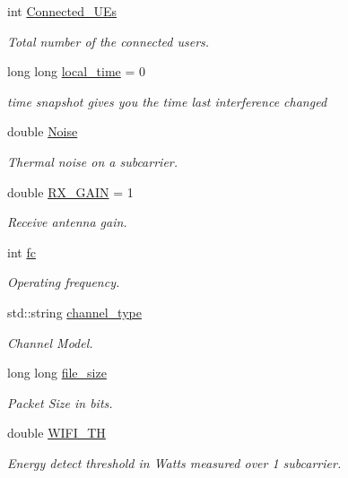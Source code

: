\begin{DoxyCompactItemize}
int \hyperlink{classAP_af0d927a781e8776c18758508a6845c85}{Connected\-\_\-\-U\-Es}
\begin{DoxyCompactList}\small\item\em Total number of the connected users. \end{DoxyCompactList}\item 
long long \hyperlink{classAP_ab31a52cd05ca5daf9ccd5d24941fe395}{local\-\_\-time} = 0
\begin{DoxyCompactList}\small\item\em time snapshot gives you the time last interference changed \end{DoxyCompactList}\item 
double \hyperlink{classAP_ae865c89ed6f1bace113d6ddb1a4f41d3}{Noise}
\begin{DoxyCompactList}\small\item\em Thermal noise on a subcarrier. \end{DoxyCompactList}\item 
double \hyperlink{classAP_ab6036cf0065beea6c6129d086ceb5ad5}{R\-X\-\_\-\-G\-A\-I\-N} = 1
\begin{DoxyCompactList}\small\item\em Receive antenna gain. \end{DoxyCompactList}\item 
int \hyperlink{classAP_af7f928faaa72cbfe5c4f905cb146a564}{fc}
\begin{DoxyCompactList}\small\item\em Operating frequency. \end{DoxyCompactList}\item 
std\-::string \hyperlink{classAP_a334f5b7be9725824797db57032de80e2}{channel\-\_\-type}
\begin{DoxyCompactList}\small\item\em Channel Model. \end{DoxyCompactList}\item 
long long \hyperlink{classAP_a6fe321d9d8cddb40d81e6c7152fae189}{file\-\_\-size}
\begin{DoxyCompactList}\small\item\em Packet Size in bits. \end{DoxyCompactList}\item 
double \hyperlink{classAP_a42bd4510621509219054811e7350bf29}{W\-I\-F\-I\-\_\-\-T\-H}
\begin{DoxyCompactList}\small\item\em Energy detect threshold in Watts measured over 1 subcarrier. \end{DoxyCompactList}\item 

\end{DoxyCompactItemize}
